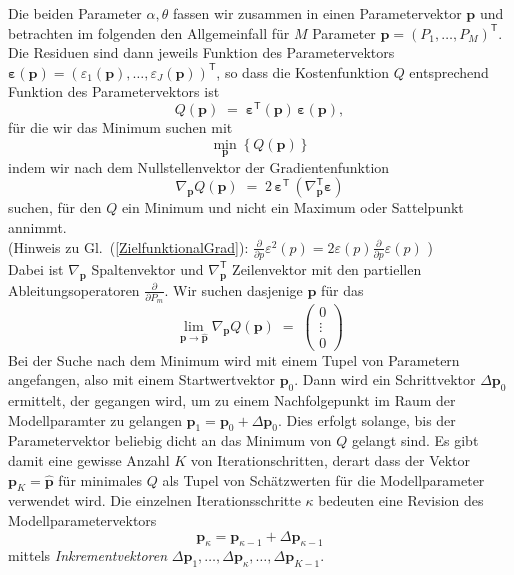Die beiden Parameter $\alpha,\theta$ fassen wir zusammen in einen Parametervektor $\mathbf{p}$ und
betrachten im folgenden den Allgemeinfall für $M$ Parameter $\mathbf{p} = (P_1,\dots,P_M)^\mathsf{T}$.
Die Residuen sind dann jeweils Funktion des Parametervektors
$\boldsymbol \varepsilon(\mathbf{p}) = (\varepsilon_1(\mathbf{p}), \dots, \varepsilon_J(\mathbf{p}))^\mathsf{T}$,
so dass die Kostenfunktion $Q$ entsprechend Funktion des Parametervektors ist
\begin{equation}
Q(\mathbf{p}) \; = \; \boldsymbol \varepsilon^\mathsf{T}(\mathbf{p}) \, \boldsymbol \varepsilon(\mathbf{p}),
\label{Zielfunktional}
\end{equation}
für die wir das Minimum suchen mit
\begin{equation}
\min_{\mathbf{p}} \left\{ Q(\mathbf{p}) \right\}
\end{equation}
indem wir nach dem Nullstellenvektor der Gradientenfunktion
\begin{equation}
\nabla_{\mathbf{p}} Q(\mathbf{p}) \; = \;
 2 \, \boldsymbol \varepsilon^\mathsf{T} \, \left( \nabla_{\mathbf{p}}^\mathsf{T} \boldsymbol \varepsilon \right)
\label{ZielfunktionalGrad}
\end{equation}
suchen, für den $Q$ ein Minimum und nicht ein Maximum oder Sattelpunkt annimmt.\\
(Hinweis zu Gl.~(\ref{ZielfunktionalGrad}): $\frac{\partial}{\partial p} \varepsilon^2(p) =
2 \varepsilon(p) \frac{\partial}{\partial p} \varepsilon(p)$ )\\
Dabei ist $\nabla_{\mathbf{p}}$ Spaltenvektor und $\nabla_{\mathbf{p}}^\mathsf{T}$ Zeilenvektor
mit den partiellen Ableitungsoperatoren $\frac{\partial}{\partial P_m}$.
Wir suchen dasjenige $\mathbf{p}$ für das
\begin{equation}
\lim_{\mathbf{p} \rightarrow \mathbf{\hat p}}
\nabla_{\mathbf{p}} Q(\mathbf{p}) \; = \; \left(\begin{array}{c} 0\\ \vdots \\ 0 \end{array}\right)
\label{ZielfunktionalGrad1}
\end{equation}
Bei der Suche nach dem Minimum wird mit einem Tupel von Parametern angefangen, also
mit einem Startwertvektor $\mathbf{p}_0$. Dann wird ein Schrittvektor $\Delta \mathbf{p}_0$ ermittelt,
der gegangen wird, um
zu einem Nachfolgepunkt im Raum der Modellparamter zu gelangen $\mathbf{p}_1 = \mathbf{p}_0 + \Delta \mathbf{p}_0$.
Dies erfolgt solange, bis der Parametervektor beliebig dicht an das Minimum von $Q$ gelangt sind. Es gibt damit eine
gewisse Anzahl $K$ von Iterationschritten, derart dass der Vektor $\mathbf{p}_K = \mathbf{\hat p}$ für minimales
$Q$ als Tupel von Schätzwerten für die Modellparameter verwendet wird.
Die einzelnen Iterationsschritte $\kappa$ bedeuten eine Revision des Modellparametervektors
\begin{equation}
\mathbf{p}_\kappa = \mathbf{p}_{\kappa-1} + \Delta \mathbf{p}_{\kappa-1}
\label{Revisionsschritt}
\end{equation}
mittels \textsl{Inkrementvektoren}
$\Delta \mathbf{p}_1, \dots, \Delta \mathbf{p}_{\kappa}, \dots, \Delta \mathbf{p}_{K-1}$.

